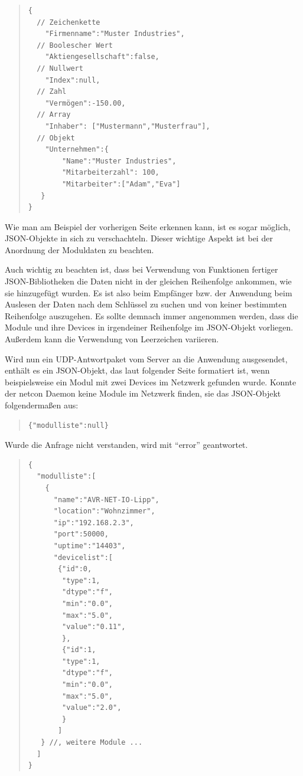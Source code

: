\documentclass[a4paper,14pt,headsepline]{scrartcl}
\begin{document}
\begin{quote}
\begin{verbatim}
{
  // Zeichenkette
    "Firmenname":"Muster Industries",
  // Boolescher Wert
    "Aktiengesellschaft":false,
  // Nullwert
    "Index":null,
  // Zahl
    "Vermögen":-150.00,
  // Array
    "Inhaber": ["Mustermann","Musterfrau"],
  // Objekt
    "Unternehmen":{
   	    "Name":"Muster Industries",
   	    "Mitarbeiterzahl": 100,
   	    "Mitarbeiter":["Adam","Eva"]
   }
}

\end{verbatim}
\end{quote}

\newpage
Wie man am Beispiel der vorherigen Seite erkennen kann, ist es sogar möglich, JSON-Objekte in sich zu verschachteln. Dieser wichtige Aspekt ist bei der Anordnung der Moduldaten zu beachten. 

Auch wichtig zu beachten ist, dass bei Verwendung von Funktionen fertiger JSON-Bibliotheken die Daten nicht in der gleichen Reihenfolge ankommen, wie sie hinzugefügt wurden. Es ist also beim Empfänger bzw. der Anwendung beim Auslesen der Daten nach dem Schlüssel zu suchen und von keiner bestimmten Reihenfolge auszugehen. Es sollte demnach immer angenommen werden, dass die Module und ihre Devices in irgendeiner Reihenfolge im JSON-Objekt vorliegen. Außerdem kann die Verwendung von Leerzeichen variieren. 

Wird nun ein UDP-Antwortpaket vom Server an die Anwendung ausgesendet, enthält es ein JSON-Objekt, das laut folgender Seite formatiert ist, wenn beispielsweise ein Modul mit zwei Devices im Netzwerk gefunden wurde. Konnte der netcon Daemon keine Module im Netzwerk finden, sie das JSON-Objekt folgendermaßen aus: 

\begin{quote}
\begin{verbatim}
{"modulliste":null}
\end{verbatim}
\end{quote}

Wurde die Anfrage nicht verstanden, wird mit ``error'' geantwortet. 


\newpage

\begin{quote}
\begin{verbatim}
{
  "modulliste":[
    {
      "name":"AVR-NET-IO-Lipp",
      "location":"Wohnzimmer",
      "ip":"192.168.2.3",
      "port":50000,
      "uptime":"14403",
      "devicelist":[
       {"id":0,
        "type":1,
        "dtype":"f",
        "min":"0.0",
        "max":"5.0",
        "value":"0.11",
        },
        {"id":1,
        "type":1,
        "dtype":"f",
        "min":"0.0",
        "max":"5.0",
        "value":"2.0",
        }
       ]
   } //, weitere Module ...
  ]
}

\end{verbatim}
\end{quote}
\end{document}
